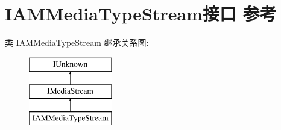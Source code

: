 \hypertarget{interface_i_a_m_media_type_stream}{}\section{I\+A\+M\+Media\+Type\+Stream接口 参考}
\label{interface_i_a_m_media_type_stream}
类 I\+A\+M\+Media\+Type\+Stream 继承关系图\+:\begin{figure}[H]
\begin{center}
\leavevmode
\includegraphics[height=3.000000cm]{interface_i_a_m_media_type_stream}
\end{center}
\end{figure}
